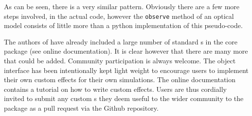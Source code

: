 As can be seen, there is a very similar pattern.
Obviously there are a few more steps involved, in the actual \ScopeSim{} code, however the \lstinline{observe} method of an optical model consists of little more than a python implementation of this pseudo-code.

The authors of \ScopeSim{} have already included a large number of standard \Effect{}s in the \ScopeSim{} core package (see online documentation).
It is clear however that there are many more that could be added.
Community participation is always welcome.
The \Effect{} object interface has been intentionally kept light weight to encourage users to implement their own custom effects for their own simulations.
The online documentation contains a tutorial on how to write custom effects.
Users are thus cordially invited to submit any custom \Effect{}s they deem useful to the wider community to the \ScopeSim{} package as a pull request via the Github repository.
